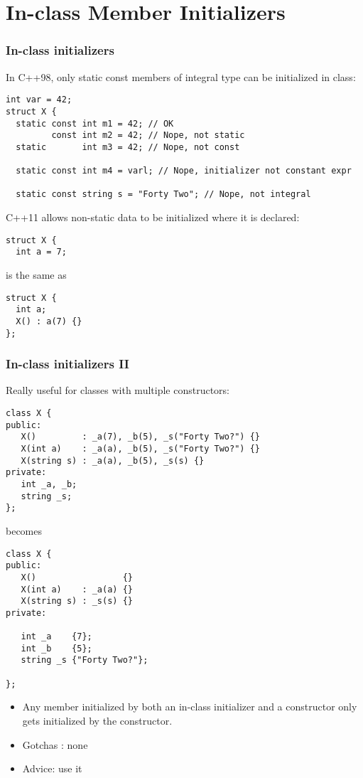 
\section{In-class Member Initializers}
\begin{frame}[fragile]

\frametitle{In-class initializers}
In C++98, only static const members of integral type can be
initialized in class:
{\scriptsize
\begin{verbatim}
int var = 42;
struct X {
  static const int m1 = 42; // OK
         const int m2 = 42; // Nope, not static
  static       int m3 = 42; // Nope, not const

  static const int m4 = varl; // Nope, initializer not constant expr

  static const string s = "Forty Two"; // Nope, not integral
\end{verbatim}
}
\pause{}
C++11 allows non-static data to be initialized where it is declared:

{\scriptsize
\begin{verbatim}
struct X {
  int a = 7;
\end{verbatim}
}

is the same as

{\scriptsize
\begin{verbatim}
struct X {
  int a;
  X() : a(7) {}
};
\end{verbatim}
}

\end{frame}


\begin{frame}[fragile]
\frametitle{In-class initializers II}
Really useful for classes with multiple constructors:

{\scriptsize
\begin{verbatim}
class X {
public:
   X()         : _a(7), _b(5), _s("Forty Two?") {}
   X(int a)    : _a(a), _b(5), _s("Forty Two?") {}
   X(string s) : _a(a), _b(5), _s(s) {}
private:
   int _a, _b;
   string _s;
};
\end{verbatim}
}

becomes

{\scriptsize
\begin{verbatim}
class X {
public:
   X()                 {}
   X(int a)    : _a(a) {}
   X(string s) : _s(s) {}
private:

   int _a    {7};
   int _b    {5};
   string _s {"Forty Two?"};

};
\end{verbatim}
}

\vskip 12pt

\begin{itemize}
\item Any member initialized by both an in-class initializer and a
constructor only gets initialized by the constructor.
\item Gotchas : none
\item Advice: use it
\end{itemize}


\end{frame}
